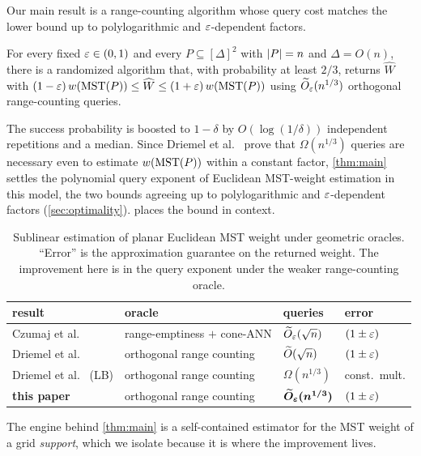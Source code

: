 Our main result is a range-counting algorithm whose query cost matches the lower bound up to
polylogarithmic and $\varepsilon$-dependent factors.

\begin{theorem*}
For every fixed $\varepsilon\in(0,1)$ and every $P\subseteq[\Delta]^2$ with $\left|P\right|=n$ and $\Delta=O(n)$, there
is a randomized algorithm that, with probability at least $2/3$, returns $\widehat W$ with
$(1-\varepsilon)\,w(\mathrm{MST}(P))\le\widehat W\le(1+\varepsilon)\,w(\mathrm{MST}(P))$ using $\widetilde{O}_\varepsilon(n^{1/3})$ orthogonal
range-counting queries.
\end{theorem*}

The success probability is boosted to $1-\delta$ by $O(\log(1/\delta))$ independent repetitions and a
median. Since Driemel et al.~\cite{DMOSW25} prove that $\Omega(n^{1/3})$ queries are necessary even to
estimate $w(\mathrm{MST}(P))$ within a constant factor, \cref{thm:main} settles the polynomial query exponent
of Euclidean MST-weight estimation in this model, the two bounds agreeing up to polylogarithmic and
$\varepsilon$-dependent factors (\cref{sec:optimality}).  places the bound in context.

\begin{table}[t]
\centering
\small
\begin{tabular}{llll}
\toprule
result & oracle & queries & error\\
\midrule
Czumaj et al.~\cite{Czumaj05} & range-emptiness $+$ cone-ANN & $\widetilde{O}_\varepsilon(\sqrt n)$ & $(1\pm\varepsilon)$\\
Driemel et al.~\cite{DMOSW25} & orthogonal range counting & $\widetilde{O}(\sqrt n)$ & $(1\pm\varepsilon)$\\
Driemel et al.~\cite{DMOSW25} (LB) & orthogonal range counting & $\Omega(n^{1/3})$ & const.\ mult.\\
\textbf{this paper} & orthogonal range counting & $\boldsymbol{\widetilde{O}_\varepsilon(n^{1/3})}$ & $(1\pm\varepsilon)$\\
\bottomrule
\end{tabular}
\caption{Sublinear estimation of planar Euclidean MST weight under geometric oracles. ``Error'' is the
approximation guarantee on the returned weight. The improvement here is in the query exponent under the
weaker range-counting oracle.}
\label{tab:prior}
\end{table}

The engine behind \cref{thm:main} is a self-contained estimator for the MST weight of a grid
\emph{support}, which we isolate because it is where the improvement lives.

